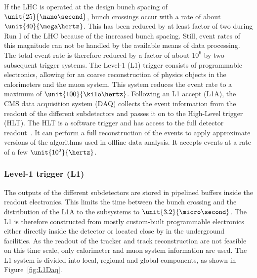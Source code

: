 If the LHC is operated at the design bunch spacing of $\unit{25}{\nano\second}$, bunch crossings occur with a rate of about $\unit{40}{\mega\hertz}$. This has been reduced by at least factor of two during Run I of the LHC because of the increased bunch spacing. Still, event rates of this magnitude can not be handled by the available means of data processing. The total event rate is therefore reduced by a factor of about $10^6$ by two subsequent trigger systems. The Level-1 (L1) trigger consists of programmable electronics, allowing for an coarse reconstruction of physics objects in the calorimeters and the muon system. This system reduces the event rate to a maximum of $\unit{100}{\kilo\hertz}$. Following an L1 accept (L1A), the CMS data acquisition system (DAQ) collects the event information from the readout of the different subdetectors and passes it on to the High-Level trigger (HLT). The HLT is a software trigger and has access to the full detector readout~\cite{Adam:2005zf}. It can perform a full reconstruction of the events to apply approximate versions of the algorithms used in offline data analysis. It accepts events at a rate of a few $\unit{10^2}{\hertz}$.  

\subsubsection*{Level-1 trigger (L1)}
The outputs of the different subdetectors are stored in pipelined buffers inside the readout electronics. This limits the time between the bunch crossing and the distribution of the L1A to the subsystems to $\unit{3.2}{\micro\second}$. The L1 is therefore constructed from mostly custom-built programmable electronics either directly inside the detector or located close by in the underground facilities. As the readout of the tracker and track reconstruction are not feasible on this time scale, only calorimeter and muon system information are used. The L1 system is divided into local, regional and global components, as shown in Figure~\ref{fig:L1Daq}. 

